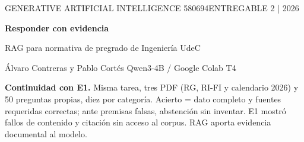 \documentclass[10pt,a4paper]{article}
\begin{document}
{\color{accent}\small GENERATIVE ARTIFICIAL INTELLIGENCE 580694\hfill ENTREGABLE 2 | 2026}
\par\vspace{5pt}
{\color{ink}\fontsize{21}{24}\selectfont\bfseries Responder con evidencia}\par
{\color{ink}\large RAG para normativa de pregrado de Ingeniería UdeC}\par
{\small Álvaro Contreras y Pablo Cortés \hfill Qwen3-4B / Google Colab T4}
\par{}\vspace{4pt}
{\small\textbf{Continuidad con E1.} Misma tarea, tres PDF (RG, RI-FI y calendario 2026) y 50 preguntas propias, diez por categoría. Acierto = dato completo y fuentes requeridas correctas; ante premisas falsas, abstención sin inventar. E1 mostró fallos de contenido y citación sin acceso al corpus. RAG aporta evidencia documental al modelo.}
\end{document}
